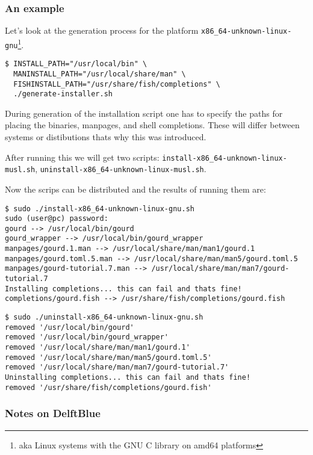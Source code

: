 \subsubsection{An example}
\label{sec:installexample1}

Let's look at the generation process for the platform \texttt{x86\_64-unknown-linux-gnu}\footnote{aka Linux systems with the GNU C library on amd64 platforms}.

\begin{verbatim}
$ INSTALL_PATH="/usr/local/bin" \
  MANINSTALL_PATH="/usr/local/share/man" \
  FISHINSTALL_PATH="/usr/share/fish/completions" \
  ./generate-installer.sh
\end{verbatim}

During generation of the installation script one has to specify the paths for placing the binaries, manpages, and shell completions.
These will differ between systems or distibutions thats why this was introduced.

After running this we will get two scripts: \texttt{install-x86\_64-unknown-linux-musl.sh}, \texttt{uninstall-x86\_64-unknown-linux-musl.sh}.

Now the scrips can be distributed and the results of running them are:

\begin{verbatim}
$ sudo ./install-x86_64-unknown-linux-gnu.sh
sudo (user@pc) password:
gourd --> /usr/local/bin/gourd
gourd_wrapper --> /usr/local/bin/gourd_wrapper
manpages/gourd.1.man --> /usr/local/share/man/man1/gourd.1
manpages/gourd.toml.5.man --> /usr/local/share/man/man5/gourd.toml.5
manpages/gourd-tutorial.7.man --> /usr/local/share/man/man7/gourd-tutorial.7
Installing completions... this can fail and thats fine!
completions/gourd.fish --> /usr/share/fish/completions/gourd.fish
\end{verbatim}

\begin{verbatim}
$ sudo ./uninstall-x86_64-unknown-linux-gnu.sh
removed '/usr/local/bin/gourd'
removed '/usr/local/bin/gourd_wrapper'
removed '/usr/local/share/man/man1/gourd.1'
removed '/usr/local/share/man/man5/gourd.toml.5'
removed '/usr/local/share/man/man7/gourd-tutorial.7'
Uninstalling completions... this can fail and thats fine!
removed '/usr/share/fish/completions/gourd.fish'
\end{verbatim}


\subsubsection{Notes on DelftBlue}
\label{sec:installexample2}

